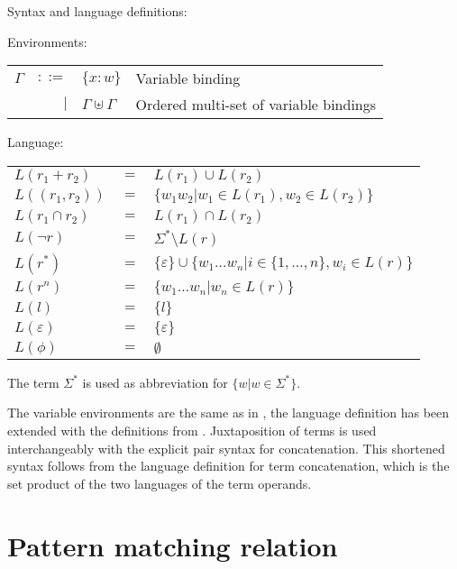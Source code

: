 \begin{defn}
   \label{defn-lang}
   Syntax and language definitions:

   Environments:

   \begin{tabular}{lrll}
      $\Gamma$	& $::=$	& $\{x:w\}$			& Variable binding	\\
		& $|$	& $\Gamma \uplus \Gamma$	& Ordered multi-set of
							  variable bindings	\\
   \end{tabular}

   \needspace{5cm}

   Language:

   \begin{tabular}{lll}
      $L(r_1 + r_2)$	& $=$	& $L(r_1) \cup L(r_2)$					\\
      $L((r_1, r_2))$	& $=$	& $\{ w_1w_2 | w_1 \in L(r_1), w_2 \in L(r_2) \}$	\\
      $L(r_1 \cap r_2)$	& $=$	& $L(r_1) \cap L(r_2)$					\\
      $L(\neg r)$	& $=$	& $\Sigma^* \setminus L(r)$				\\
      $L(r^*)$		& $=$	&
         $\{\varepsilon\} \cup \{ w_1 \dots w_n | i
         \in \{ 1, \dots, n \}, w_i \in L(r) \}$	\\
      $L(r^n)$		& $=$	&
         $\{ w_1 \dots w_n | w_n \in L(r) \}$	\\
      $L(l)$		& $=$	& $\{l\}$						\\
      $L(\varepsilon)$	& $=$	& $\{\varepsilon\}$					\\
      $L(\phi)$		& $=$	& $\emptyset$						\\
   \end{tabular}
\end{defn}


The term $\Sigma^*$ is used as abbreviation for $\{ w | w \in \Sigma^* \}$.

The variable environments are the same as in \cite{pdpat}, the language
definition has been extended with the definitions from \cite{pdere}.
Juxtaposition of terms is used interchangeably with the explicit pair syntax
for concatenation. This shortened syntax follows from the language definition
for term concatenation, which is the set product of the two languages of the
term operands.


\section{Pattern matching relation}
\label{patmatchrel}


